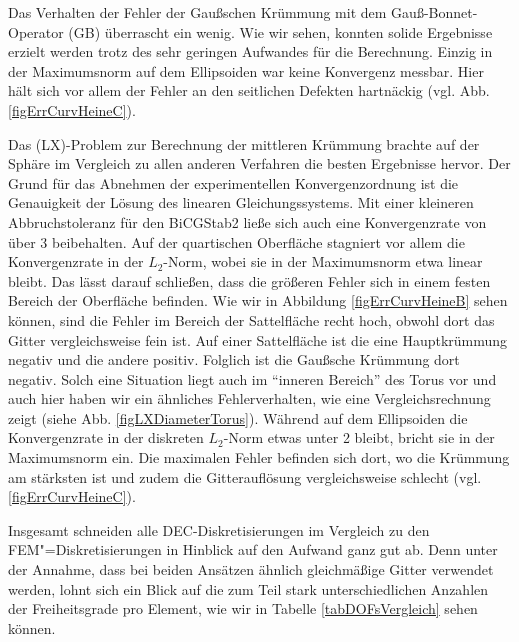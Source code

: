   Das Verhalten der Fehler der Gaußschen Krümmung mit dem Gauß-Bonnet-Operator (GB) überrascht ein wenig.
  Wie wir sehen, konnten solide Ergebnisse erzielt werden trotz des sehr geringen Aufwandes für die Berechnung.
  Einzig in der Maximumsnorm auf dem Ellipsoiden war keine Konvergenz messbar.
  Hier hält sich vor allem der Fehler an den seitlichen Defekten hartnäckig (vgl. Abb.
  \ref{figErrCurvHeineC}).

  Das (LX)-Problem zur Berechnung der mittleren Krümmung brachte auf der Sphäre im Vergleich zu allen
  anderen Verfahren die besten Ergebnisse hervor. 
  Der Grund für das Abnehmen der experimentellen Konvergenzordnung ist die Genauigkeit der Lösung des
  linearen Gleichungssystems.
  Mit einer kleineren Abbruchstoleranz für den BiCGStab2 ließe sich auch eine Konvergenzrate von über 3
  beibehalten.
  Auf der quartischen Oberfläche stagniert vor allem die Konvergenzrate in der \( L_{2} \)-Norm, wobei sie
  in der Maximumsnorm etwa linear bleibt. 
  Das lässt darauf schließen, dass die größeren Fehler sich in einem festen Bereich der Oberfläche
  befinden.
  Wie wir in Abbildung \ref{figErrCurvHeineB} sehen können, sind die Fehler im Bereich der Sattelfläche
  recht hoch, obwohl dort das Gitter vergleichsweise fein ist.
  Auf einer Sattelfläche ist die eine Hauptkrümmung negativ und die andere positiv. 
  Folglich ist die
  Gaußsche Krümmung dort negativ. 
  Solch eine Situation liegt auch im "`inneren Bereich"' des Torus vor und auch hier haben wir ein ähnliches
  Fehlerverhalten, wie eine Vergleichsrechnung zeigt (siehe Abb. \ref{figLXDiameterTorus}).
  Während auf dem Ellipsoiden die Konvergenzrate in der diskreten \( L_{2} \)-Norm etwas unter 2 bleibt,
  bricht sie in der Maximumsnorm ein.
  Die maximalen Fehler befinden sich dort, wo die Krümmung am stärksten ist und zudem die
  Gitterauflösung vergleichsweise schlecht (vgl. \ref{figErrCurvHeineC}).

  Insgesamt schneiden alle DEC-Diskretisierungen im Vergleich zu den FEM"=Diskretisierungen in Hinblick auf den Aufwand ganz gut ab.
  Denn unter der Annahme, dass bei beiden Ansätzen ähnlich gleichmäßige Gitter verwendet werden, lohnt sich ein Blick auf die zum Teil stark unterschiedlichen Anzahlen der Freiheitsgrade
  pro Element, wie wir in Tabelle \ref{tabDOFsVergleich} sehen können. 

